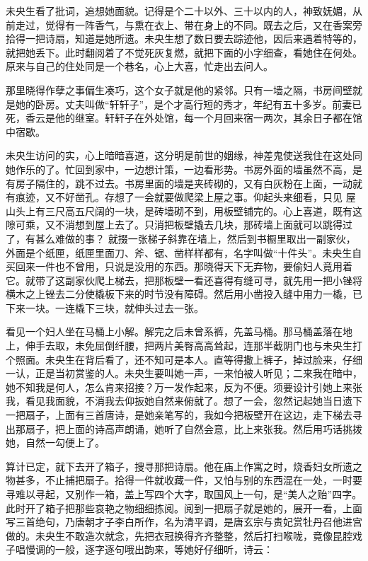 \documentclass[a4paper,12pt,UTF8,twoside]{ctexbook}
\begin{document}
未央生看了批词，追想她面貌。记得是个二十以外、三十以内的人，神致妩媚，从前走过，觉得有一阵香气，与熏在衣上、带在身上的不同。既去之后，又在香案旁拾得一把诗扇，知道是她所遗。未央生想了数日要去踪迹他，因后来遇着特等的，就把她丢下。此时翻阅着了不觉死灰复燃，就把下面的小字细查，看她住在何处。原来与自己的住处同是一个巷名，心上大喜，忙走出去问人。

那里晓得作孽之事偏生凑巧，这个女子就是他的紧邻。只有一墙之隔，书房间壁就是她的卧房。丈夫叫做“轩轩子”，是个才高行短的秀才，年纪有五十多岁。前妻已死，香云是他的继室。轩轩子在外处馆，每一个月回来宿一两次，其余日子都在馆中宿歇。

未央生访问的实，心上暗暗喜道，这分明是前世的姻缘，神差鬼使送我住在这处同她作乐的了。忙回到家中，一边想计策，一边看形势。书房外面的墙虽然不高，是有房子隔住的，跳不过去。书房里面的墙是夹砖砌的，又有白灰粉在上面，一动就有痕迹，又不好凿孔。存想了一会就要做爬梁上屋之事。仰起头来细看，只见 屋山头上有三尺高五尺阔的一块，是砖墙砌不到，用板壁铺完的。心上喜道，既有这隙可乘，又不消想到屋上去了。只消把板壁撬去几块，那砖墙上面就可以跳得过了，有甚么难做的事？ 就掇一张梯子斜靠在墙上，然后到书橱里取出一副家伙，外面是个纸匣，纸匣里面刀、斧、锯、凿样样都有，名字叫做“十件头”。未央生自买回来一件也不曾用，只说是没用的东西。那晓得天下无弃物，要偷妇人竟用着它。就带了这副家伙爬上梯去，把那板壁一看还喜得有缝可寻，就先用一把小锉将横木之上锉去二分使橇板下来的时节没有障碍。然后用小凿投入缝中用力一橇，已下来一块。一连橇下三块，就伸头过去一张。

看见一个妇人坐在马桶上小解。解完之后未曾系裤，先盖马桶。那马桶盖落在地上，伸手去取，未免屈倒纤腰，把两片美臀高高耸起，连那半截阴门也与未央生打个照面。未央生在背后看了，还不知可是本人。直等得撒上裤子，掉过脸来，仔细一认，正是当初赏鉴的人。未央生要叫她一声，一来怕被人听见；二来我在暗中，她不知我是何人，怎么肯来招接？万一发作起来，反为不便。须要设计引她上来张我，看见我面貌，不消我去仰扳她自然来俯就了。想了一会，忽然记起她当日遗下一把扇子，上面有三首唐诗，是她亲笔写的，我如今把板壁开在这边，走下梯去寻出那扇子，把上面的诗高声朗诵，她听了自然会意，比上来张我。然后用巧话挑拨她，自然一勾便上了。

算计已定，就下去开了箱子，搜寻那把诗扇。他在庙上作寓之时，烧香妇女所遗之物甚多，不止捕把扇子。拾得一件就收藏一件，又怕与别的东西混在一处，一时要寻难以寻起，又别作一箱，盖上写四个大字，取国风上一句，是“美人之贻”四字。此时开了箱子把那些哀艳之物细细拣阅。阅到一把扇子就是她的，展开一看，上面写三首绝句，乃唐朝才子李白所作，名为清平调，是唐玄宗与贵妃赏牡丹召他进宫做的。未央生不敢造次就念，先把衣冠换得齐齐整整，然后打扫喉咙，竟像昆腔戏子唱慢调的一般，逐字逐句哦出韵来，等她好仔细听，诗云：
\end{document}

